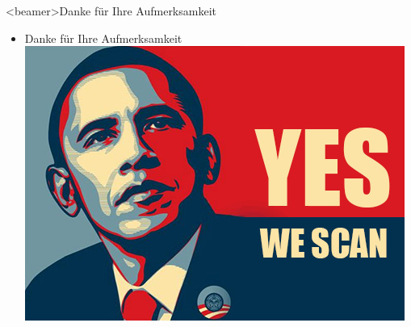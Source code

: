     \begin{frame}<beamer>{Danke für Ihre Aufmerksamkeit}
      \begin{itemize}
       \item Danke für Ihre Aufmerksamkeit
       \\
\includegraphics[height=0.75\textheight]{sections/img/yes-we-scan.jpg}
      \end{itemize}
    \end{frame}
 
